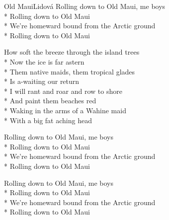 \documentclass[10.5pt]{book}
\begin{document}
\begin{poem}{Old Maui}{Lidová}
Rolling down to Old Maui, me boys\\*
Rolling down to Old Maui\\*
We're homeward bound from the Arctic ground\\*
Rolling down to Old Maui

How soft the breeze through the island trees\\*
Now the ice is far astern\\*
Them native maids, them tropical glades\\*
Is a-waiting our return\\*
I will rant and roar and row to shore\\*
And paint them beaches red\\*
Waking in the arms of a Wahine maid\\*
With a big fat aching head

Rolling down to Old Maui, me boys\\*
Rolling down to Old Maui\\*
We're homeward bound from the Arctic ground\\*
Rolling down to Old Maui

Rolling down to Old Maui, me boys\\*
Rolling down to Old Maui\\*
We're homeward bound from the Arctic ground\\*
Rolling down to Old Maui

\end{poem}
\end{document}
